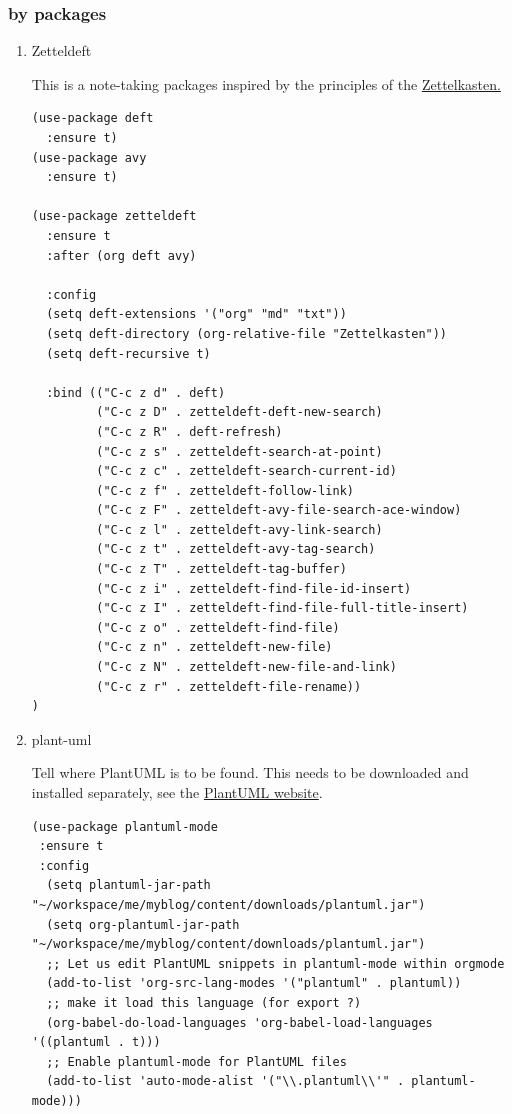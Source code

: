 \documentclass[11pt]{article}
\begin{document}
\subsubsection{by packages}
\label{sec:org783d09d}
\begin{enumerate}
\item Zetteldeft
\label{sec:org87d1098}

This is a note-taking packages inspired by the principles of the
\href{https://zettelkasten.de/}{Zettelkasten.}

\begin{verbatim}
(use-package deft
  :ensure t)
(use-package avy
  :ensure t)

(use-package zetteldeft
  :ensure t
  :after (org deft avy)

  :config
  (setq deft-extensions '("org" "md" "txt"))
  (setq deft-directory (org-relative-file "Zettelkasten"))
  (setq deft-recursive t)

  :bind (("C-c z d" . deft)
         ("C-c z D" . zetteldeft-deft-new-search)
         ("C-c z R" . deft-refresh)
         ("C-c z s" . zetteldeft-search-at-point)
         ("C-c z c" . zetteldeft-search-current-id)
         ("C-c z f" . zetteldeft-follow-link)
         ("C-c z F" . zetteldeft-avy-file-search-ace-window)
         ("C-c z l" . zetteldeft-avy-link-search)
         ("C-c z t" . zetteldeft-avy-tag-search)
         ("C-c z T" . zetteldeft-tag-buffer)
         ("C-c z i" . zetteldeft-find-file-id-insert)
         ("C-c z I" . zetteldeft-find-file-full-title-insert)
         ("C-c z o" . zetteldeft-find-file)
         ("C-c z n" . zetteldeft-new-file)
         ("C-c z N" . zetteldeft-new-file-and-link)
         ("C-c z r" . zetteldeft-file-rename))
)
\end{verbatim}

\item plant-uml
\label{sec:org9676ac2}

Tell where PlantUML is to be found. This needs to be downloaded and
installed separately, see the \href{http://plantuml.com/}{PlantUML website}.

\begin{verbatim}
(use-package plantuml-mode
 :ensure t
 :config
  (setq plantuml-jar-path "~/workspace/me/myblog/content/downloads/plantuml.jar")
  (setq org-plantuml-jar-path "~/workspace/me/myblog/content/downloads/plantuml.jar")
  ;; Let us edit PlantUML snippets in plantuml-mode within orgmode
  (add-to-list 'org-src-lang-modes '("plantuml" . plantuml))
  ;; make it load this language (for export ?)
  (org-babel-do-load-languages 'org-babel-load-languages '((plantuml . t)))
  ;; Enable plantuml-mode for PlantUML files
  (add-to-list 'auto-mode-alist '("\\.plantuml\\'" . plantuml-mode)))
\end{verbatim}
\end{enumerate}
\end{document}
